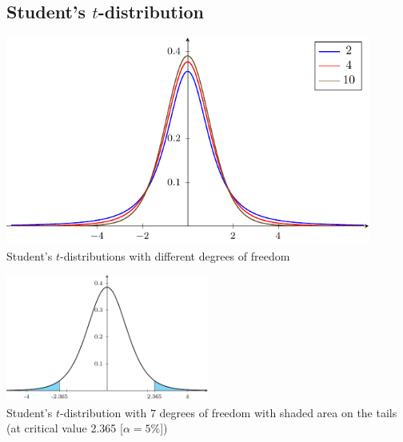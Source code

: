 \documentclass[a4paper]{article}
\begin{document}
	\subsection{Student's $t$-distribution}
		\begin{center}
		\includegraphics[width=0.9\textwidth]{T-distributions}
		\\
		Student's $t$-distributions with different degrees of freedom


		\includegraphics[width=0.5\textwidth]{T-distribution-shaded}\\
		Student's $t$-distribution with $7$ degrees of freedom with shaded area on the tails (at critical value 2.365 [$\alpha=5\%$])
		\end{center}		
\end{document}
